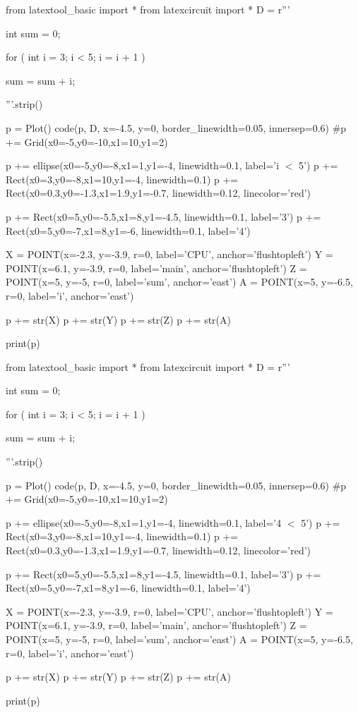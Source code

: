 \begin{python}
from latextool_basic import *
from latexcircuit import *
D = r'''



int sum = 0;

    for ( int i = 3;     i < 5;     i = i + 1 )


        sum = sum + i;



'''.strip()

p = Plot()
code(p, D, x=-4.5, y=0, border_linewidth=0.05, innersep=0.6)
#p += Grid(x0=-5,y0=-10,x1=10,y1=2)

p += ellipse(x0=-5,y0=-8,x1=1,y1=-4, linewidth=0.1, label='i $<$ 5')
p += Rect(x0=3,y0=-8,x1=10,y1=-4, linewidth=0.1)
p += Rect(x0=0.3,y0=-1.3,x1=1.9,y1=-0.7, linewidth=0.12, linecolor='red')

p += Rect(x0=5,y0=-5.5,x1=8,y1=-4.5, linewidth=0.1, label='3')
p += Rect(x0=5,y0=-7,x1=8,y1=-6, linewidth=0.1, label='4')

X = POINT(x=-2.3, y=-3.9, r=0, label='CPU', anchor='flushtopleft')
Y = POINT(x=6.1, y=-3.9, r=0, label='main', anchor='flushtopleft')
Z = POINT(x=5, y=-5, r=0, label='sum', anchor='east')
A = POINT(x=5, y=-6.5, r=0, label='i', anchor='east')

p += str(X)
p += str(Y)
p += str(Z)
p += str(A)

print(p)
\end{python}

\begin{python}
from latextool_basic import *
from latexcircuit import *
D = r'''



int sum = 0;

    for ( int i = 3;     i < 5;     i = i + 1 )


        sum = sum + i;



'''.strip()

p = Plot()
code(p, D, x=-4.5, y=0, border_linewidth=0.05, innersep=0.6)
#p += Grid(x0=-5,y0=-10,x1=10,y1=2)

p += ellipse(x0=-5,y0=-8,x1=1,y1=-4, linewidth=0.1, label='4 $<$ 5')
p += Rect(x0=3,y0=-8,x1=10,y1=-4, linewidth=0.1)
p += Rect(x0=0.3,y0=-1.3,x1=1.9,y1=-0.7, linewidth=0.12, linecolor='red')

p += Rect(x0=5,y0=-5.5,x1=8,y1=-4.5, linewidth=0.1, label='3')
p += Rect(x0=5,y0=-7,x1=8,y1=-6, linewidth=0.1, label='4')

X = POINT(x=-2.3, y=-3.9, r=0, label='CPU', anchor='flushtopleft')
Y = POINT(x=6.1, y=-3.9, r=0, label='main', anchor='flushtopleft')
Z = POINT(x=5, y=-5, r=0, label='sum', anchor='east')
A = POINT(x=5, y=-6.5, r=0, label='i', anchor='east')

p += str(X)
p += str(Y)
p += str(Z)
p += str(A)

print(p)
\end{python}

